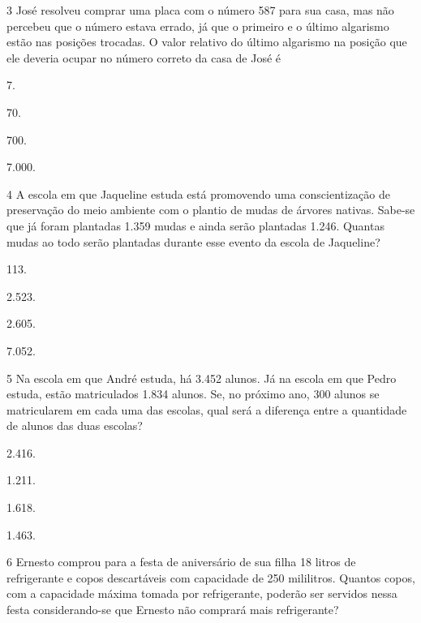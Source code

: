 \num{3} José resolveu comprar uma placa com o número 587 para sua casa, mas
não percebeu que o número estava
errado, já que o primeiro e o último algarismo estão nas posições
trocadas. O valor relativo do último algarismo na posição que ele deveria ocupar no número correto da casa de José é

\begin{multicols}{2}
\begin{escolha}
\item
  7.
\item
  70.
\item
  700.
\item
  7.000.
\end{escolha}
\end{multicols}


\num{4} A escola em que Jaqueline estuda está promovendo uma conscientização de
preservação do meio ambiente com o plantio de mudas de árvores
nativas. Sabe-se que já foram plantadas 1.359 mudas e ainda serão
plantadas 1.246. Quantas mudas ao todo serão plantadas durante esse
evento da escola de Jaqueline?

\begin{multicols}{2}
\begin{escolha}
\item
  113.
\item
  2.523.
\item
  2.605.
\item
  7.052.
\end{escolha}
\end{multicols}

\num{5} Na escola em que André estuda, há 3.452 alunos. Já na escola em que
Pedro estuda, estão matriculados 1.834 alunos. Se, no próximo ano, 300
alunos se matricularem em cada uma das escolas, qual será a diferença
entre a quantidade de alunos das duas escolas?

\begin{multicols}{2}
\begin{escolha}
\item
  2.416.
\item
  1.211.
\item
  1.618.
\item
  1.463.
\end{escolha}
\end{multicols}

\num{6} Ernesto comprou para a festa de aniversário de sua filha 18 litros de
refrigerante e copos descartáveis com capacidade de 250 mililitros.
Quantos copos, com a capacidade máxima tomada por refrigerante, poderão
ser servidos nessa festa considerando-se que Ernesto não comprará mais
refrigerante?

